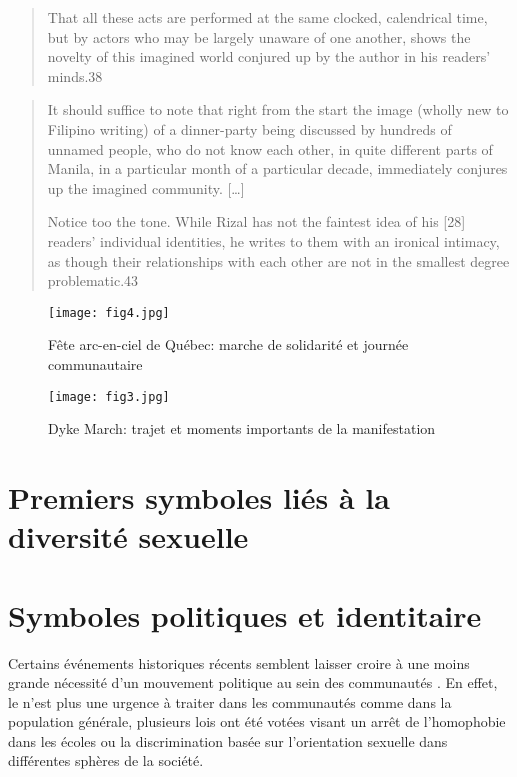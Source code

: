 \begin{quote}
  That all these acts are performed at the same clocked, calendrical time, but   by actors who may be largely unaware of one another, shows the novelty of this imagined world conjured up by the author in his readers' minds.38
  \citep{Anderson1983}
\end{quote}

\begin{quote}
	
It should suffice to note that right from the start the image (wholly new to Filipino writing) of a dinner-party being discussed by hundreds of unnamed people, who do not know each other, in quite different parts of Manila, in a particular month of a particular decade, immediately conjures up the imagined community.
[\ldots]

Notice too the tone. 
While Rizal has not the faintest idea of his [28] readers' individual identities, he writes to them with an ironical intimacy, as though their relationships with each other are not in the smallest degree problematic.43
\end{quote}


\begin{figure}[ht]
	\centering
	\texttt{[image: fig4.jpg]}
	\caption{Fête arc-en-ciel de Québec: marche de solidarité et journée
    communautaire}
	\label{fig:figure4}
\end{figure}

\begin{figure}[ht]
	\centering
	\texttt{[image: fig3.jpg]}
	\caption[]{Dyke March: trajet et moments importants de la manifestation}
	\label{fig:figure3}
\end{figure}


\section{Premiers symboles liés à la diversité sexuelle}
\label{sec:premiers_symboles_li_s_la_diversit_sexuelle}


\section{Symboles politiques et identitaire}
\label{sec:symboles_politiques_et_identitaire}
Certains événements historiques récents semblent laisser croire à une moins grande nécessité d'un mouvement politique au sein des communautés \lgbt{}.
En effet, le \sida{} n'est plus une urgence à traiter dans les communautés \lgbt{} comme dans la population générale, plusieurs lois ont été votées visant un arrêt de l'homophobie dans les écoles ou la discrimination basée sur l'orientation sexuelle dans différentes sphères de la société.

